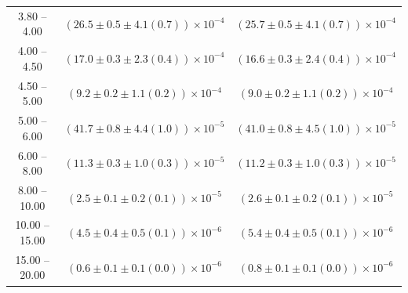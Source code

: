 \begin{table}
\begin{center}
\begin{tabular}{ c | c c }
3.80 -- 4.00 & $(26.5\pm0.5\pm4.1(0.7))\times10^{-4}$ & $(25.7\pm0.5\pm4.1(0.7))\times10^{-4}$ \\ 
4.00 -- 4.50 & $(17.0\pm0.3\pm2.3(0.4))\times10^{-4}$ & $(16.6\pm0.3\pm2.4(0.4))\times10^{-4}$ \\ 
4.50 -- 5.00 & $(9.2\pm0.2\pm1.1(0.2))\times10^{-4}$ & $(9.0\pm0.2\pm1.1(0.2))\times10^{-4}$ \\ 
5.00 -- 6.00 & $(41.7\pm0.8\pm4.4(1.0))\times10^{-5}$ & $(41.0\pm0.8\pm4.5(1.0))\times10^{-5}$ \\ 
6.00 -- 8.00 & $(11.3\pm0.3\pm1.0(0.3))\times10^{-5}$ & $(11.2\pm0.3\pm1.0(0.3))\times10^{-5}$ \\ 
8.00 -- 10.00 & $(2.5\pm0.1\pm0.2(0.1))\times10^{-5}$ & $(2.6\pm0.1\pm0.2(0.1))\times10^{-5}$ \\ 
10.00 -- 15.00 & $(4.5\pm0.4\pm0.5(0.1))\times10^{-6}$ & $(5.4\pm0.4\pm0.5(0.1))\times10^{-6}$ \\ 
15.00 -- 20.00 & $(0.6\pm0.1\pm0.1(0.0))\times10^{-6}$ & $(0.8\pm0.1\pm0.1(0.0))\times10^{-6}$ \\ 
\hline
\end{tabular}
\end{center}
\end{table}
 
